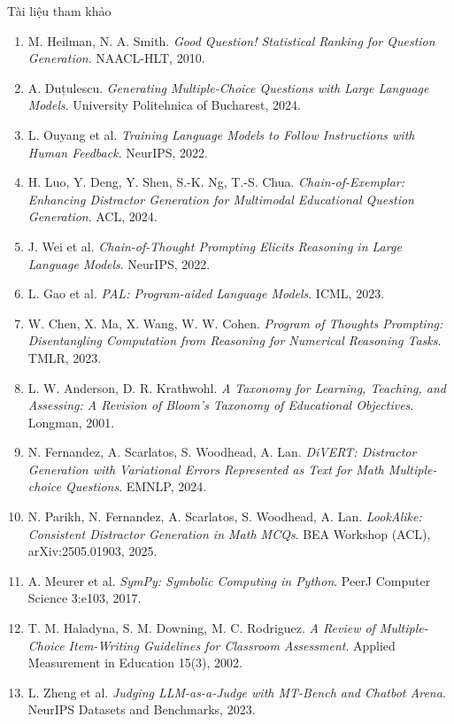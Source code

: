 \documentclass[aspectratio=169,11pt]{beamer}
\begin{document}
\begin{frame}[allowframebreaks]{Tài liệu tham khảo}
  \tiny
  \begin{enumerate}
    \item M. Heilman, N. A. Smith. \emph{Good Question! Statistical Ranking for Question Generation}. NAACL-HLT, 2010.
    \item A. Duțulescu. \emph{Generating Multiple-Choice Questions with Large Language Models}. University Politehnica of Bucharest, 2024.
    \item L. Ouyang et al. \emph{Training Language Models to Follow Instructions with Human Feedback}. NeurIPS, 2022.
    \item H. Luo, Y. Deng, Y. Shen, S.-K. Ng, T.-S. Chua. \emph{Chain-of-Exemplar: Enhancing Distractor Generation for Multimodal Educational Question Generation}. ACL, 2024.
    \item J. Wei et al. \emph{Chain-of-Thought Prompting Elicits Reasoning in Large Language Models}. NeurIPS, 2022.
    \item L. Gao et al. \emph{PAL: Program-aided Language Models}. ICML, 2023.
    \item W. Chen, X. Ma, X. Wang, W. W. Cohen. \emph{Program of Thoughts Prompting: Disentangling Computation from Reasoning for Numerical Reasoning Tasks}. TMLR, 2023.
    \item L. W. Anderson, D. R. Krathwohl. \emph{A Taxonomy for Learning, Teaching, and Assessing: A Revision of Bloom's Taxonomy of Educational Objectives}. Longman, 2001.
    \item N. Fernandez, A. Scarlatos, S. Woodhead, A. Lan. \emph{DiVERT: Distractor Generation with Variational Errors Represented as Text for Math Multiple-choice Questions}. EMNLP, 2024.
    \item N. Parikh, N. Fernandez, A. Scarlatos, S. Woodhead, A. Lan. \emph{LookAlike: Consistent Distractor Generation in Math MCQs}. BEA Workshop (ACL), arXiv:2505.01903, 2025.
    \item A. Meurer et al. \emph{SymPy: Symbolic Computing in Python}. PeerJ Computer Science 3:e103, 2017.
    \item T. M. Haladyna, S. M. Downing, M. C. Rodriguez. \emph{A Review of Multiple-Choice Item-Writing Guidelines for Classroom Assessment}. Applied Measurement in Education 15(3), 2002.
    \item L. Zheng et al. \emph{Judging LLM-as-a-Judge with MT-Bench and Chatbot Arena}. NeurIPS Datasets and Benchmarks, 2023.

\end{enumerate}
\end{frame}
\end{document}
